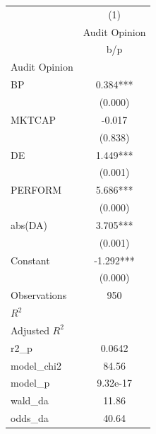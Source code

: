 {
\def\sym#1{\ifmmode^{#1}\else\(^{#1}\)\fi}
\begin{tabular}{l*{1}{c}}
\hline\hline
                    &\multicolumn{1}{c}{(1)}\\
                    &\multicolumn{1}{c}{Audit Opinion}\\
                    &         b/p   \\
\hline
Audit Opinion       &               \\
BP                  &       0.384***\\
                    &     (0.000)   \\
MKTCAP              &      -0.017   \\
                    &     (0.838)   \\
DE                  &       1.449***\\
                    &     (0.001)   \\
PERFORM             &       5.686***\\
                    &     (0.000)   \\
abs(DA)             &       3.705***\\
                    &     (0.001)   \\
Constant            &      -1.292***\\
                    &     (0.000)   \\
\hline
Observations        &         950   \\
\(R^{2}\)           &               \\
Adjusted \(R^{2}\)  &               \\
r2\_p                &      0.0642   \\
model\_chi2          &       84.56   \\
model\_p             &    9.32e-17   \\
wald\_da             &       11.86   \\
odds\_da             &       40.64   \\
\hline\hline
\end{tabular}
}
